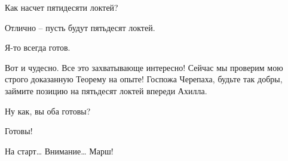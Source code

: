 \documentclass[../main.tex]{subfiles}
\begin{document}
\begin{dialogue}
 Как насчет пятидесяти локтей?

 Отлично \--- пусть будут пятьдесят локтей.

 Я-то всегда готов.

 Вот и чудесно. Все это захватывающе интересно! Сейчас мы проверим мою строго доказанную Теорему на опыте! Госпожа Черепаха, будьте так добры, займите позицию на пятьдесят локтей впереди Ахилла.


Ну как, вы оба готовы?

 Готовы!

 На старт\ldots{} Внимание\ldots{} Марш!

\end{dialogue}
\end{document}
